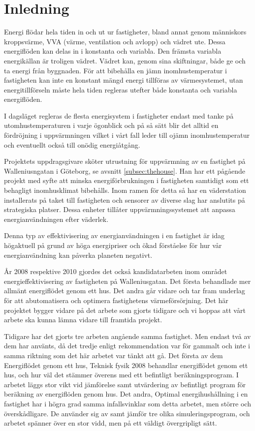 \chapter{Inledning}

Energi flödar hela tiden in och ut ur fastigheter, bland annat genom människors kroppsvärme, VVA (värme, ventilation och avlopp) och vädret ute. Dessa energiflöden kan delas in i konstanta och variabla. Den främsta variabla energikällan är troligen vädret. Vädret kan, genom sina skiftningar, både ge och ta energi från byggnaden. För att bibehålla en jämn inomhustemperatur i fastigheten kan inte en konstant mängd energi tillföras av värmesystemet, utan energitillförseln måste hela tiden regleras utefter både konstanta och variabla energiflöden.

I dagsläget regleras de flesta energisystem i fastigheter endast med tanke på utomhustemperaturen i varje ögonblick och på så sätt blir det alltid en fördröjning i uppvärmningen vilket i vårt fall leder till ojämn inomhustemperatur och eventuellt också till onödig energiåtgång.

Projektets uppdragsgivare sköter utrustning för uppvärmning av en fastighet på Walleniusngatan i Göteborg, se avsnitt \ref{subsec:thehouse}. Han har ett pågående projekt med syfte att minska energiförbrukningen i fastigheten samtidigt som ett behagligt inomhusklimat bibehålls. Inom ramen för detta så har en väderstation installerats på taket till fastigheten och sensorer av diverse slag har anslutits på strategiska platser.  Dessa enheter tillåter uppvärmningssystemet att anpassa energianvändningen efter väderlek.

Denna typ av effektivisering av energianvändningen i en fastighet är idag högaktuell på grund av höga energipriser och ökad förståelse för hur vår energianvändning kan påverka planeten negativt.

År 2008 respektive 2010 gjordes det också kandidatarbeten inom området energieffektivisering av fastigheten på Walleniusgatan. Det första\cite{kandidatarbete2008} behandlade mer allmänt energiflödet genom ett hus. Det andra\cite{kandidatarbete2010} går vidare och tar fram underlag för att abutomatisera och optimera fastighetens värmeförsörjning. Det här projektet bygger vidare på det arbete som gjorts tidigare och vi hoppas att vårt arbete ska kunna lämna vidare till framtida projekt.

Tidigare har det gjorts tre arbeten angående samma fastighet.  Men endast två av dem har använts, då det tredje enligt rekommendation var för gammalt och inte i samma riktning som det här arbetet var tänkt att gå.
Det första av dem Energiflödet genom ett hus, Teknisk fysik 2008 behandlar energiflödet genom ett hus, och hur väl det stämmer överens med ett befintligt beräkningsprogram. I arbetet läggs stor vikt vid jämförelse samt utvärdering av befintligt program för beräkning av energiflöden genom hus.
Det andra, Optimal energihushållning i en fastighet har i högra grad samma infallsvinklar som detta arbetet, men större och överskådligare. De använder sig av samt jämför tre olika simuleringsprogram, och arbetet spänner över en stor vidd, men på ett väldigt övergripligt sätt.






